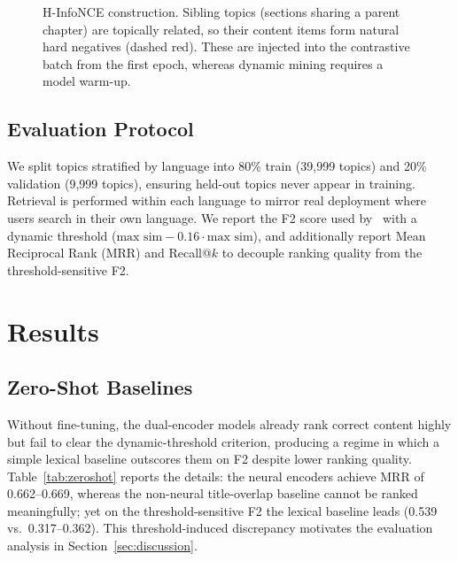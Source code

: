 \documentclass[applsci,article,submit,pdftex,moreauthors]{Definitions/mdpi}
\begin{document}
\begin{figure}[H]
\caption{H-InfoNCE construction. Sibling topics (sections sharing a parent chapter) are topically related, so their content items form natural hard negatives (dashed red). These are injected into the contrastive batch from the first epoch, whereas dynamic mining requires a model warm-up.\label{fig:hinfonce}}
\end{figure}

\subsection{Evaluation Protocol}

We split topics stratified by language into 80\% train (39,999 topics) and 20\% validation (9,999 topics), ensuring held-out topics never appear in training. Retrieval is performed within each language to mirror real deployment where users search in their own language. We report the F2 score used by~\cite{lecr-kaggle} with a dynamic threshold ($\text{max sim} - 0.16 \cdot \text{max sim}$), and additionally report Mean Reciprocal Rank (MRR) and Recall@$k$ to decouple ranking quality from the threshold-sensitive F2.

\section{Results}\label{sec:results}

\subsection{Zero-Shot Baselines}

Without fine-tuning, the dual-encoder models already rank correct content highly but fail to clear the dynamic-threshold criterion, producing a regime in which a simple lexical baseline outscores them on F2 despite lower ranking quality. Table~\ref{tab:zeroshot} reports the details: the neural encoders achieve MRR of 0.662--0.669, whereas the non-neural title-overlap baseline cannot be ranked meaningfully; yet on the threshold-sensitive F2 the lexical baseline leads (0.539 vs.\ 0.317--0.362). This threshold-induced discrepancy motivates the evaluation analysis in Section~\ref{sec:discussion}.
\end{document}
